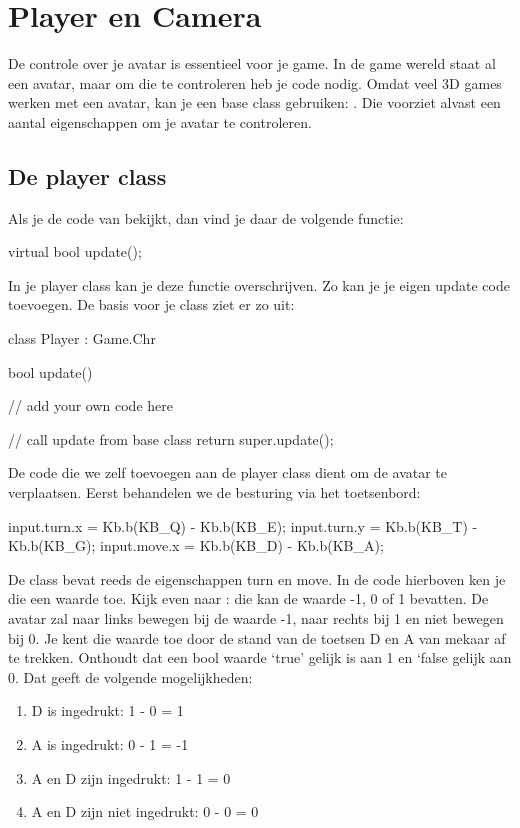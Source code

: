 \section{Player en Camera}
De controle over je avatar is essentieel voor je game. In de game wereld staat al een avatar, maar om die te controleren heb je code nodig. Omdat veel 3D games werken met een avatar, kan je een base class gebruiken: . Die voorziet alvast een aantal eigenschappen om je avatar te controleren.

\subsection{De player class}
Als je de code van  bekijkt, dan vind je daar de volgende functie:

\begin{code}
virtual bool update();
\end{code}

In je player class kan je deze functie overschrijven. Zo kan je je eigen update code toevoegen. De basis voor je class ziet er zo uit:

\begin{code}
class Player : Game.Chr
{
	bool update()
	{
		// add your own code here
	
		// call update from base class
		return super.update();
	}
}
\end{code}

De code die we zelf toevoegen aan de player class dient om de avatar te verplaatsen. Eerst behandelen we de besturing via het toetsenbord:

\begin{code}
input.turn.x = Kb.b(KB_Q) - Kb.b(KB_E);
input.turn.y = Kb.b(KB_T) - Kb.b(KB_G);
input.move.x = Kb.b(KB_D) - Kb.b(KB_A); 
\end{code}

De class  bevat reeds de eigenschappen turn en move. In de code hierboven ken je die een waarde toe. Kijk even naar : die kan de waarde -1, 0 of 1 bevatten. De avatar zal naar links bewegen bij de waarde -1, naar rechts bij 1 en niet bewegen bij 0. Je kent die waarde toe door de stand van de toetsen D en A van mekaar af te trekken. Onthoudt dat een bool waarde `true' gelijk is aan 1 en `false gelijk aan 0. Dat geeft de volgende mogelijkheden:

\begin{enumerate}
	\item D is ingedrukt: 1 - 0 =  1 
	\item A is ingedrukt: 0 - 1 = -1
	\item A en D zijn ingedrukt: 1 - 1 = 0
	\item A en D zijn niet ingedrukt: 0 - 0 = 0
\end{enumerate}

